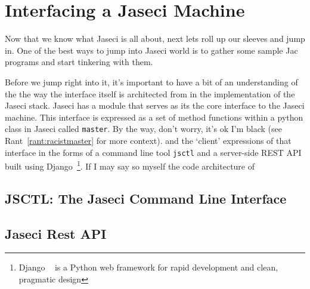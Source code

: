 \chapter{Interfacing a Jaseci Machine}
Now that we know what Jaseci is all about, next lets roll up our sleeves and jump in. One of the best ways to jump into Jaseci world is to gather some sample Jac programs and start tinkering with them.


Before we jump right into it, it's important to have a bit of an understanding of the the way the interface itself is architected from in the implementation of the Jaseci stack. Jaseci has a module that serves as its  the core interface to the Jaseci machine. This interface is expressed as a set of method functions within a python class in Jaseci  called \texttt{master}. By the way, don't worry, it's ok I'm black (see Rant~\ref{rant:racistmaster} for more context).  and the `client' expressions of that interface in the forms of a command line tool \texttt{jsctl} and a server-side REST API built using Django~\footnote{Django ~\cite{django} is a Python web framework for rapid development and clean, pragmatic design}. If I may say so myself the code architecture of
\printtabJSAPI
\section{JSCTL: The Jaseci Command Line Interface}
\section{Jaseci Rest API}